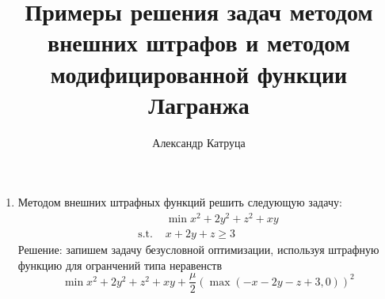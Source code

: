\documentclass[12pt]{article}
\title{Примеры решения задач методом внешних штрафов и методом модифицированной функции Лагранжа}
\author{Александр Катруца}
\date{}
\begin{document}
\maketitle

\begin{enumerate}
\item Методом внешних штрафных функций решить следующую задачу:
\begin{equation*}
\begin{split}
& \min x^2 + 2y^2 + z^2 + xy\\
\text{s.t. } & x + 2y + z \geq 3
\end{split}
\end{equation*}
Решение: запишем задачу безусловной оптимизации, используя штрафную функцию для огранчений типа неравенств
\begin{equation}
\min x^2 + 2y^2 + z^2 + xy + \frac{\mu}{2} (\max(-x - 2y - z + 3, 0))^2
\label{eq::penalty_problem}
\end{equation}


\end{enumerate}
\end{document}
